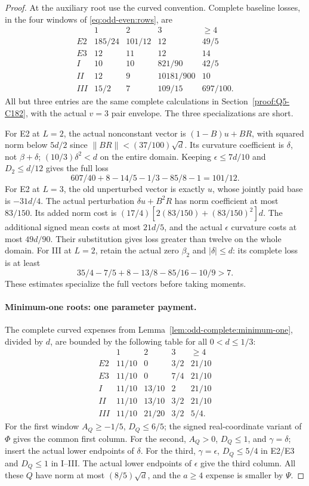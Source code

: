\begin{proof}
At the auxiliary root use the curved convention. Complete baseline
losses, in the four windows of \eqref{eq:odd-even:rows}, are
\begin{equation}\label{eq:odd-even:baselines}
\begin{array}{c|cccc}
 &1&2&3&\ge4\\\hline
 E2&185/24&101/12&12&49/5\\
 E3&12&11&12&14\\
 I&10&10&821/90&42/5\\
 II&12&9&10181/900&10\\
 III&15/2&7&109/15&697/100.
\end{array}
\end{equation}
All but three entries are the same complete calculations in
Section~\ref{proof:Q5-C182}, with the actual $v=3$ pair envelope.
The three specializations are short.

For E2 at $L=2$, the actual nonconstant vector is
$(1-B)u+BR$, with squared norm below $5d/2$ since
$\|BR\|<(37/100)\sqrt d$.
Its curvature coefficient is $\delta$, not $\beta+\delta$;
$(10/3)\delta^2<d$ on the entire domain.
Keeping $\epsilon\le7d/10$ and $D_2\le d/12$ gives the full loss
\[
 607/40+8-14/5-1/3-85/8-1=101/12.
\]
For E2 at $L=3$, the old unperturbed vector is exactly $u$,
whose jointly paid base is $-31d/4$.
The actual perturbation $\delta u+B^2R$ has norm coefficient at
most $83/150$. Its added norm cost is
$(17/4)[2(83/150)+(83/150)^2]d$.
The additional signed mean costs at most $21d/5$, and the actual
$\epsilon$ curvature costs at most $49d/90$. Their substitution
gives loss greater than twelve on the whole domain.
For III at $L=2$, retain the actual zero $\beta_2$ and
$|\delta|\le d$: its complete loss is at least
\[
 35/4-7/5+8-13/8-85/16-10/9>7.
\]
These estimates specialize the full vectors before taking moments.

\paragraph{Minimum-one roots: one parameter payment.}
The complete curved expenses from
Lemma~\ref{lem:odd-complete:minimum-one}, divided by $d$, are
bounded by the following table for all $0<d\le1/3$:
\[
\begin{array}{c|cccc}
 &1&2&3&\ge4\\\hline
 E2&11/10&0&3/2&21/10\\
 E3&11/10&0&7/4&21/10\\
 I&11/10&13/10&2&21/10\\
 II&11/10&13/10&3/2&21/10\\
 III&11/10&21/20&3/2&5/4.
\end{array}
\]
For the first window $A_Q\ge-1/5$, $D_Q\le6/5$; the signed
real-coordinate variant of $\Phi$ gives the common first column.
For the second, $A_Q>0$, $D_Q\le1$, and $\gamma=\delta$;
insert the actual lower endpoints of $\delta$.
For the third, $\gamma=\epsilon$, $D_Q\le5/4$ in E2/E3 and
$D_Q\le1$ in I--III. The actual lower endpoints of $\epsilon$
give the third column. All these $Q$ have norm at most
$(8/5)\sqrt d$, and the $a\ge4$ expense is smaller by $\Psi$.


\end{proof}
